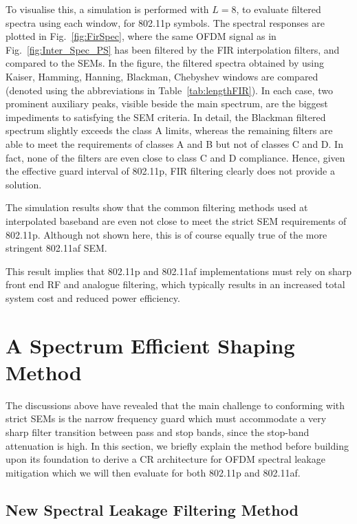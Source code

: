 To visualise this, a simulation is performed with $L=8$, to evaluate filtered spectra using each window, for 802.11p symbols.
The spectral responses are plotted in Fig.~\ref{fig:FirSpec}, where the same OFDM signal as in Fig.~\ref{fig:Inter_Spec_PS} has been filtered by the FIR interpolation filters, and compared to the SEMs.
In the figure, the filtered spectra obtained by using Kaiser, Hamming, Hanning, Blackman, Chebyshev windows are compared (denoted using the abbreviations in Table~\ref{tab:lengthFIR}).
In each case, two prominent auxiliary peaks, visible beside the main spectrum, are the biggest impediments to satisfying the SEM criteria.
In detail, the Blackman filtered spectrum slightly exceeds the class A limits, whereas the remaining filters are able to meet the requirements of classes A and B but not of classes C and D. In fact, none of the filters are even close to class C and D compliance.
Hence, given the effective guard interval of 802.11p, FIR filtering clearly does not provide a solution.

The simulation results show that the common filtering methods used at interpolated baseband are even not close to meet the strict SEM requirements of 802.11p. 
Although not shown here, this is of course equally true of the more stringent 802.11af SEM.

This result implies that 802.11p and 802.11af implementations must rely on sharp front end RF and analogue filtering, which typically results in an increased total system cost and reduced power efficiency.

\section{A Spectrum Efficient Shaping Method}
The discussions above have revealed that the main challenge to conforming with strict SEMs is the narrow frequency guard which must accommodate a very sharp filter transition between pass and stop bands, since the stop-band attenuation is high.
In this section, we briefly explain the method before building upon its foundation to derive a CR architecture for OFDM spectral leakage mitigation which we will then evaluate for both 802.11p and 802.11af.

\subsection{New Spectral Leakage Filtering Method}

